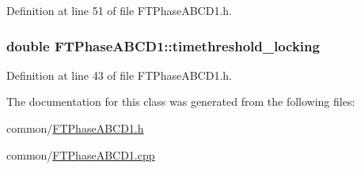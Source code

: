 Definition at line 51 of file FTPhaseABCD1.h.

\hypertarget{classFTPhaseABCD1_a5ad155e1d7ac3ad4c60f3c0768ae8e56}{
\subsubsection[{timethreshold\_\-locking}]{\setlength{\rightskip}{0pt plus 5cm}double {\bf FTPhaseABCD1::timethreshold\_\-locking}}}
\label{classFTPhaseABCD1_a5ad155e1d7ac3ad4c60f3c0768ae8e56}


Definition at line 43 of file FTPhaseABCD1.h.



The documentation for this class was generated from the following files:\begin{DoxyCompactItemize}
\item 
common/\hyperlink{FTPhaseABCD1_8h}{FTPhaseABCD1.h}\item 
common/\hyperlink{FTPhaseABCD1_8cpp}{FTPhaseABCD1.cpp}\end{DoxyCompactItemize}
